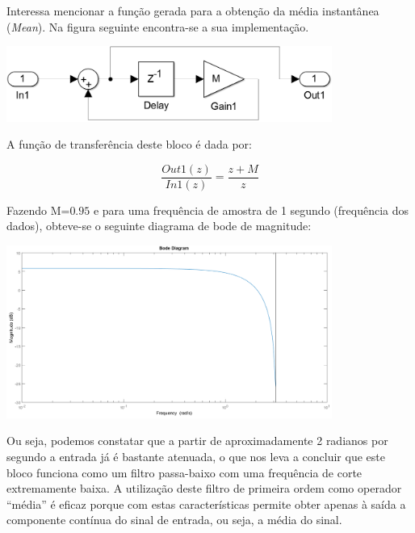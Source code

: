 \documentclass[a4paper,11pt]{report}
\begin{document}
Interessa mencionar a função gerada para a obtenção da média instantânea (\emph{Mean}). Na figura seguinte encontra-se a sua implementação.

\begin{center}
     \includegraphics[angle=0,width=0.8\textwidth]{mean.png}
     \label{fig:mean}
     \end{center}

A função de transferência deste bloco é dada por:

\begin{equation}
\dfrac{Out1(z)}{In1(z)}=\dfrac{z+M}{z}
\end{equation}

Fazendo M=$0.95$ e para uma frequência de amostra de 1 segundo (frequência dos dados), obteve-se o seguinte diagrama de bode de magnitude:
\begin{center}
     \includegraphics[angle=0,width=0.8\textwidth]{meanmag.png}
     \label{fig:meanmag}
     \end{center}

Ou seja, podemos constatar que a partir de aproximadamente 2 radianos por segundo a entrada já é bastante atenuada, o que nos leva a concluir que este bloco funciona como um filtro passa-baixo com uma frequência de corte extremamente baixa. A utilização deste filtro de primeira ordem como operador ``média'' é eficaz porque com estas características permite obter apenas à saída a componente contínua do sinal de entrada, ou seja, a média do sinal.
\end{document}
